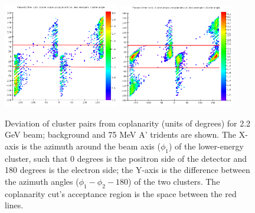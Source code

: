 \begin{figure}[ht]
	\includegraphics[width=0.45\textwidth]{performance/trigger/coplanarity_22}
	\includegraphics[width=0.45\textwidth]{performance/trigger/coplanarity_22_075mev}
	\caption{\small{Deviation of cluster pairs from coplanarity (units of degrees) for 2.2 GeV beam; background and 75 MeV A' tridents are shown. The X-axis is the azimuth around the beam axis ($\phi_1$) of the lower-energy cluster, such that 0 degrees is the positron side of the detector and 180 degrees is the electron side; the Y-axis is the difference between the azimuth angles ($\phi_1-\phi_2 - 180$) of the two clusters. The coplanarity cut's acceptance region is the space between the red lines.}}
	\label{fig:coplanarity}
\end{figure}

